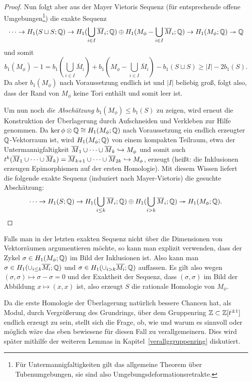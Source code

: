 \begin{proof}
	 \noindent Nun folgt aber aus der Mayer Vietoris Sequenz (für entsprechende offene Umgebungen\footnote{Für Untermannigfaltigkeiten gilt das allgemeine Theorem über Tubenumgebungen, sie sind also Umgebungsdeformationsretrakte.}) die exakte Sequenz
	  \[
	  	\cdots\to H_1(S\sqcup S;\mathbb{Q}) \to H_1(\bigcup_{i \in I} \overline M_i;\mathbb{Q}) \oplus H_1(M_\phi -\bigcup_{i \in I} \overline M_i;\mathbb{Q}) \to H_1(M_\phi;\mathbb{Q}) \twoheadrightarrow \mathbb{Q}
	  \]
	  und somit
	  \[
	  	b_1(M_\phi) -1= b_1(\bigcup_{i \in I} \overline M_i)+b_1(M_\phi -\bigcup_{i \in I} \overline M_i)-b_1(S\sqcup S) \geq |I| -2b_1(S).
	  \]
	  Da aber $b_1(M_\phi)$ nach Voraussetzung endlich ist und $|I|$ beliebig groß, folgt also, dass der Rand von $M_\phi$ keine Tori enthält und somit leer ist.

	  Um nun noch\emph{ die Abschätzung $b_1(M_\phi) \leq b_1(S)$ }zu zeigen, wird erneut die Konstruktion der Überlagerung durch Aufschneiden und Verkleben zur Hilfe genommen. Da $\ker\phi \otimes \mathbb{Q} \cong H_1(M_\phi;\mathbb{Q})$ nach Voraussetzung ein endlich erzeugter $\mathbb{Q}$-Vektorraum ist, wird $H_1(M_\phi;\mathbb{Q})$ von einem kompakten Teilraum, etwa der Untermannigfaltigkeit $\overline M_1 \cup \cdots \cup \overline M_k \hookrightarrow M_\phi$ und somit auch $t^k(\overline M_1 \cup \cdots \cup \overline M_k )  = \overline M_{k+1} \cup \cdots \cup \overline M_{2k}\hookrightarrow M_\phi$, erzeugt (heißt: die Inklusionen erzeugen Epimorphismen auf der ersten Homologie). Mit diesem Wissen liefert die folgende exakte Sequenz (induziert nach Mayer-Vietoris) die gesuchte Abschätzung:
	  \[
	  	\cdots \to H_1(S;\mathbb{Q}) \to H_1(\bigcup_{i\leq k}\overline M_i;\mathbb{Q}) \oplus H_1(\bigcup_{i>k} \overline M_i;\mathbb{Q}) \twoheadrightarrow H_1(M_\phi;\mathbb{Q}).
	  \]
\end{proof}
\begin{bem}
	Falls man in der letzten exakten Sequenz nicht über die Dimensionen von Vektorräumen argumentieren möchte, so kann man explizit verwenden, dass der Zykel $\sigma \in H_1(M_\phi;\mathbb{Q})$ im Bild der Inklusionen ist. Also kann man $\sigma \in H_1(\cup_{i\leq k} \overline{M_i};\mathbb{Q})$ und $\sigma \in H_1(\cup_{i > k} \overline{M_i};\mathbb{Q})$ auffassen. Es gilt also wegen $(\sigma,\sigma) \mapsto \sigma-\sigma=0$  und der Exaktheit der Sequenz, dass $(\sigma,\sigma)$ im Bild der Abbildung $x \mapsto (x,x)$ ist, also erzeugt $S$ die rationale Homologie von $M_\phi$.
\end{bem}
\begin{bem}
Da die erste Homologie der Überlagerung natürlich bessere Chancen hat, als Modul, durch Vergrößerung des Grundrings, über dem Gruppenring $\mathbb{Z}\subset \mathbb{Z}[t^{\pm 1}]$ endlich erzeugt zu sein, stellt sich die Frage, ob, wie und warum es sinnvoll oder möglich wäre das eben bewiesene für diesen Fall zu verallgemeinern. Dies wird später mithilfe der weiteren Lemmas in Kapitel~\ref{verallggruppenring} diskutiert. 
\end{bem}
